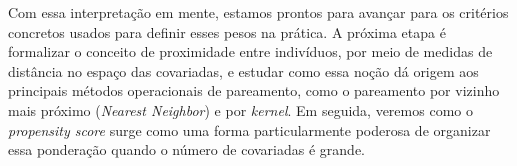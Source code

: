 Com essa interpretação em mente, estamos prontos para avançar para os critérios concretos usados para definir esses pesos na prática. A próxima etapa é formalizar o conceito de proximidade entre indivíduos, por meio de medidas de distância no espaço das covariadas, e estudar como essa noção dá origem aos principais métodos operacionais de pareamento, como o pareamento por vizinho mais próximo (\textit{Nearest Neighbor}) e por \textit{kernel}. Em seguida, veremos como o \textit{propensity score} surge como uma forma particularmente poderosa de organizar essa ponderação quando o número de covariadas é grande.

